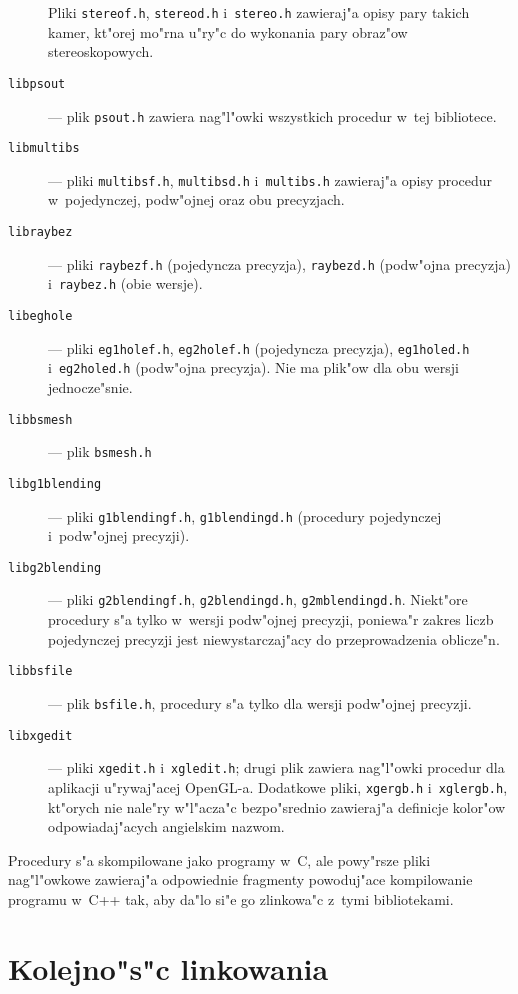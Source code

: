 \begin{description}
Pliki \texttt{stereof.h}, \texttt{stereod.h} i~\texttt{stereo.h} zawieraj"a
opisy pary takich kamer, kt"orej mo"rna u"ry"c do wykonania pary obraz"ow
stereoskopowych. 
\item[\texttt{libpsout}]--- plik \texttt{psout.h} zawiera nag"l"owki
wszystkich procedur w~tej bibliotece.
\item[\texttt{libmultibs}]--- pliki \texttt{multibsf.h}, \texttt{multibsd.h}
i~\texttt{multibs.h} zawieraj"a opisy procedur w~pojedynczej, podw"ojnej
oraz obu precyzjach.
\item[\texttt{libraybez}]--- pliki \texttt{raybezf.h} (pojedyncza precyzja),
\texttt{raybezd.h} (podw"ojna precyzja) i~\texttt{raybez.h} (obie wersje).
\item[\texttt{libeghole}]--- pliki \texttt{eg1holef.h}, \texttt{eg2holef.h}
(pojedyncza precyzja), \texttt{eg1holed.h} i~\texttt{eg2holed.h}
(podw"ojna precyzja). Nie ma plik"ow dla obu wersji jed\-no\-cze"s\-nie.
\item[\texttt{libbsmesh}]--- plik \texttt{bsmesh.h}
\item[\texttt{libg1blending}]--- pliki \texttt{g1blendingf.h},
\texttt{g1blendingd.h} (procedury pojedynczej i~podw"ojnej precyzji).
\item[\texttt{libg2blending}]--- pliki \texttt{g2blendingf.h},
\texttt{g2blendingd.h}, \texttt{g2mblendingd.h}. Niekt"ore procedury s"a
tylko w~wersji podw"ojnej precyzji, poniewa"r zakres liczb pojedynczej
precyzji jest niewystarczaj"acy do przeprowadzenia oblicze"n.
\item[\texttt{libbsfile}]--- plik \texttt{bsfile.h}, procedury s"a tylko dla
wersji podw"ojnej precyzji.
\item[\texttt{libxgedit}]--- pliki \texttt{xgedit.h} i~\texttt{xgledit.h};
drugi plik zawiera nag"l"owki procedur dla aplikacji u"rywaj"acej OpenGL-a.
Dodatkowe pliki, \texttt{xgergb.h} i~\texttt{xglergb.h}, kt"orych nie nale"ry
w"l"acza"c bezpo"srednio zawieraj"a definicje kolor"ow odpowiadaj"acych
angielskim nazwom.
\end{description}

Procedury s"a skompilowane jako programy w~C, ale powy"rsze pliki
nag"l"owkowe zawieraj"a odpowiednie fragmenty powoduj"ace kompilowanie
programu w~C++ tak, aby da"lo si"e go zlinkowa"c z~tymi bibliotekami.


\section{Kolejno"s"c linkowania}

